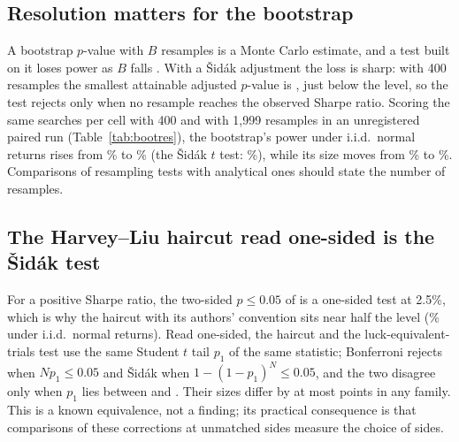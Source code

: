 \subsection{Resolution matters for the bootstrap}
\label{sec:bootres}
A bootstrap $p$-value with $B$ resamples is a Monte Carlo estimate, and a test built on it loses power as $B$ falls \citep{davidson2000bootstrap}. With a \v{S}id\'ak adjustment the loss is sharp: with 400 resamples the smallest attainable adjusted $p$-value is , just below the level, so the test rejects only when no resample reaches the observed Sharpe ratio. Scoring the same  searches per cell with 400 and with 1,999 resamples in an unregistered paired run (Table~\ref{tab:bootres}), the bootstrap's power under i.i.d.\ normal returns rises from \% to \% (the \v{S}id\'ak $t$ test: \%), while its size moves from \% to \%. Comparisons of resampling tests with analytical ones should state the number of resamples.

\subsection{The Harvey--Liu haircut read one-sided is the \v{S}id\'ak test}
For a positive Sharpe ratio, the two-sided $p\le 0.05$ of \citet{harvey2015backtesting} is a one-sided test at 2.5\%, which is why the haircut with its authors' convention sits near half the level (\% under i.i.d.\ normal returns). Read one-sided, the haircut and the luck-equivalent-trials test use the same Student $t$ tail $p_1$ of the same statistic; Bonferroni rejects when $Np_1\le0.05$ and \v{S}id\'ak when $1-(1-p_1)^N\le0.05$, and the two disagree only when $p_1$ lies between  and . Their sizes differ by at most  points in any family. This is a known equivalence, not a finding; its practical consequence is that comparisons of these corrections at unmatched sides measure the choice of sides.

